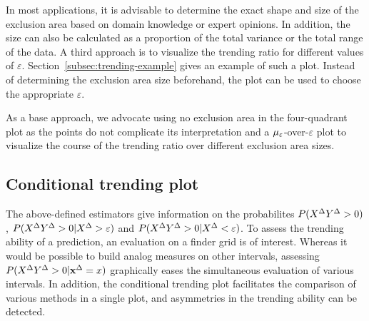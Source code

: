 In most applications, it is advisable to determine the exact shape and size of the exclusion area based on domain knowledge or expert opinions.
In addition, the size can also be calculated as a proportion of the total variance or the total range of the data.
A third approach is to visualize the trending ratio for different values of $\varepsilon$.
Section~\ref{subsec:trending-example} gives an example of such a plot.
Instead of determining the exclusion area size beforehand, the plot can be used to choose the appropriate $\varepsilon$.

As a base approach, we advocate using no exclusion area in the four-quadrant plot as the points do not complicate its interpretation and a $\mu_{\varepsilon}$-over-$\varepsilon$ plot to visualize the course of the trending ratio over different exclusion area sizes.


\subsection{Conditional trending plot}\label{subsec:trending-cond-prob}

The above-defined estimators give information on the probabilites $P(X^{\Delta} Y^{\Delta} > 0)$, $P(X^{\Delta} Y^{\Delta} > 0 | X^{\Delta} > \varepsilon)$ and $P(X^{\Delta} Y^{\Delta} > 0 | X^{\Delta} < \varepsilon)$.
To assess the trending ability of a prediction, an evaluation on a finder grid is of interest.
Whereas it would be possible to build analog measures on other intervals, assessing $P(X^{\Delta} Y^{\Delta} > 0 | \mathbf{x}^{\Delta} = x)$ graphically eases the simultaneous evaluation of various intervals.
In addition, the conditional trending plot facilitates the comparison of various methods in a single plot, and asymmetries in the trending ability can be detected.

